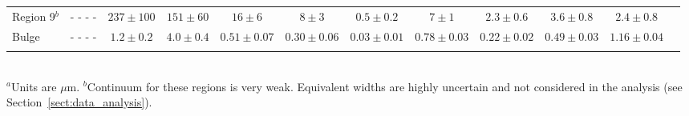 \begin{table}
\begin{minipage}{200mm}
\begin{tabular}{l c c  c  c  c  c  c  c  c  c c }
 Region 9$^b$ & - - - -                 & $237\pm100$          & $151\pm60$        & $16\pm6$                 & $8\pm3$                   & $0.5\pm0.2$             & $7\pm1$                   & $2.3\pm0.6$             & $3.6\pm0.8$                 & $2.4\pm0.8$  \\
 Bulge       & - - - -                          & $1.2\pm0.2$            & $4.0\pm0.4$        & $0.51\pm0.07$         & $0.30\pm0.06$        & $0.03\pm0.01$        & $0.78\pm0.03$        & $0.22\pm0.02$        & $0.49\pm0.03$            & $1.16\pm0.04$ \\             
\hline
 \label{EQW}
\end{tabular}\\
{$^a$Units are $\mu$m. 
$^b$Continuum for these regions is very weak.  Equivalent widths are highly uncertain and not considered in the analysis (see Section~\ref{sect:data_analysis}).}
\end{minipage}
\end{table}


